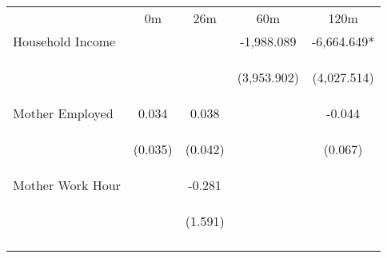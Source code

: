 \begin{tabular}{lcccc}
\hline \noalign{\smallskip} & 0m & 26m & 60m & 120m\\
\noalign{\smallskip}\hline \noalign{\smallskip}Household Income &  &  & -1,988.089 & -6,664.649*\\
 & \begin{footnotesize}\end{footnotesize} & \begin{footnotesize}\end{footnotesize} & \begin{footnotesize}(3,953.902)\end{footnotesize} & \begin{footnotesize}(4,027.514)\end{footnotesize}\\
\noalign{\smallskip}Mother Employed & 0.034 & 0.038 &  & -0.044\\
 & \begin{footnotesize}(0.035)\end{footnotesize} & \begin{footnotesize}(0.042)\end{footnotesize} & \begin{footnotesize}\end{footnotesize} & \begin{footnotesize}(0.067)\end{footnotesize}\\
\noalign{\smallskip}Mother Work Hour &  & -0.281 &  & \\
 & \begin{footnotesize}\end{footnotesize} & \begin{footnotesize}(1.591)\end{footnotesize} & \begin{footnotesize}\end{footnotesize} & \begin{footnotesize}\end{footnotesize}\\
\noalign{\smallskip}\hline\end{tabular}\\
